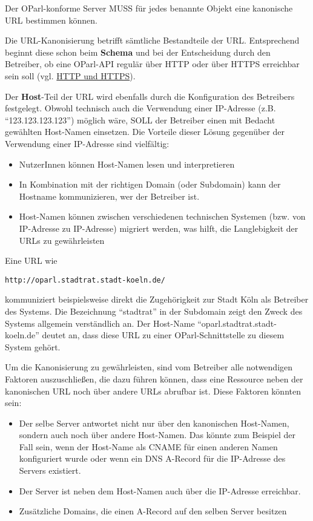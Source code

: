 \documentclass[,a4paper]{article}
\begin{document}
Der OParl-konforme Server MUSS für jedes benannte Objekt eine kanonische
URL bestimmen können.

Die URL-Kanonisierung betrifft sämtliche Bestandteile der URL.
Entsprechend beginnt diese schon beim \textbf{Schema} und bei der
Entscheidung durch den Betreiber, ob eine OParl-API regulär über HTTP
oder über HTTPS erreichbar sein soll (vgl.
\hyperref[http-und-https]{HTTP und HTTPS}).

Der \textbf{Host}-Teil der URL wird ebenfalls durch die Konfiguration
des Betreibers festgelegt. Obwohl technisch auch die Verwendung einer
IP-Adresse (z.B. ``123.123.123.123'') möglich wäre, SOLL der Betreiber
einen mit Bedacht gewählten Host-Namen einsetzen. Die Vorteile dieser
Lösung gegenüber der Verwendung einer IP-Adresse sind vielfältig:

\begin{itemize}
\itemsep1pt\parskip0pt
\item
  NutzerInnen können Host-Namen lesen und interpretieren
\item
  In Kombination mit der richtigen Domain (oder Subdomain) kann der
  Hostname kommunizieren, wer der Betreiber ist.
\item
  Host-Namen können zwischen verschiedenen technischen Systemen (bzw.
  von IP-Adresse zu IP-Adresse) migriert werden, was hilft, die
  Langlebigkeit der URLs zu gewährleisten
\end{itemize}

Eine URL wie

\begin{verbatim}
http://oparl.stadtrat.stadt-koeln.de/
\end{verbatim}

kommuniziert beispielsweise direkt die Zugehörigkeit zur Stadt Köln als
Betreiber des Systems. Die Bezeichnung ``stadtrat'' in der Subdomain
zeigt den Zweck des Systems allgemein verständlich an. Der Host-Name
``oparl.stadtrat.stadt-koeln.de'' deutet an, dass diese URL zu einer
OParl-Schnittstelle zu diesem System gehört.

Um die Kanonisierung zu gewährleisten, sind vom Betreiber alle
notwendigen Faktoren auszuschließen, die dazu führen können, dass eine
Ressource neben der kanonischen URL noch über andere URLs abrufbar ist.
Diese Faktoren könnten sein:

\begin{itemize}
\item
  Der selbe Server antwortet nicht nur über den kanonischen Host-Namen,
  sondern auch noch über andere Host-Namen. Das könnte zum Beispiel der
  Fall sein, wenn der Host-Name als CNAME für einen anderen Namen
  konfiguriert wurde oder wenn ein DNS A-Record für die IP-Adresse des
  Servers existiert.
\item
  Der Server ist neben dem Host-Namen auch über die IP-Adresse
  erreichbar.
\item
  Zusätzliche Domains, die einen A-Record auf den selben Server besitzen
\end{itemize}
\end{document}
